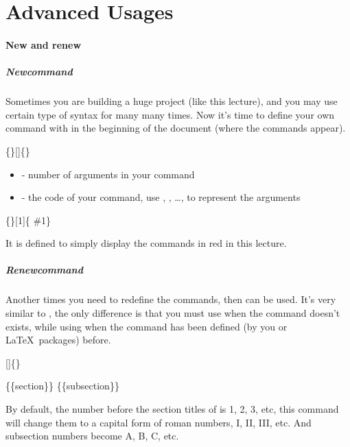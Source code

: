 \part{Advanced Usages}
\subsection{New and renew}

\begin{frame}
	\frametitle{Newcommand}
	Sometimes you are building a huge project (like this lecture), and you may use certain type of syntax for many many times. Now it's time to define your own command with  in the beginning of the document (where the  commands appear).
	\begin{command}
		\{\}[]\{\}
		\begin{itemize}
			\item {} - number of arguments in your command
			\item {} - the code of your command, use , , \dots,  to represent the arguments
		\end{itemize}
	\end{command}
	\begin{example}
		\{\}[1]\{ \#1\}
	\end{example}
	It is defined to simply display the commands in red in this lecture.
\end{frame}

\begin{frame}
	\frametitle{Renewcommand}
	Another times you need to redefine the commands, then  can be used. It's very similar to , the only difference is that you must use  when the command doesn't exists, while using  when the command has been defined (by you or \LaTeX\ packages) before.
	\begin{command}
		[]\{\structure{code}\}
	\end{command}
	\begin{example}
		\{\{section\}\}
		\{\{subsection\}\}
	\end{example}
	By default, the number before the section titles of  is 1, 2, 3, etc, this command will change them to a capital form of roman numbers, I, II, III, etc. And subsection numbers become A, B, C, etc.
\end{frame}

